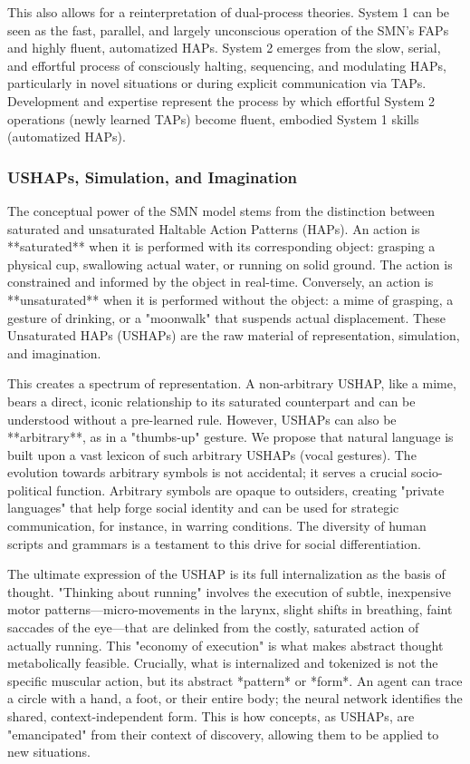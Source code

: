 This also allows for a reinterpretation of dual-process theories. System 1 can be seen as the fast, parallel, and largely unconscious operation of the SMN's FAPs and highly fluent, automatized HAPs. System 2 emerges from the slow, serial, and effortful process of consciously halting, sequencing, and modulating HAPs, particularly in novel situations or during explicit communication via TAPs. Development and expertise represent the process by which effortful System 2 operations (newly learned TAPs) become fluent, embodied System 1 skills (automatized HAPs).

\subsubsection{USHAPs, Simulation, and Imagination}
\label{ssubsec:ushaps}
The conceptual power of the SMN model stems from the distinction between saturated and unsaturated Haltable Action Patterns (HAPs). An action is **saturated** when it is performed with its corresponding object: grasping a physical cup, swallowing actual water, or running on solid ground. The action is constrained and informed by the object in real-time. Conversely, an action is **unsaturated** when it is performed without the object: a mime of grasping, a gesture of drinking, or a "moonwalk" that suspends actual displacement. These Unsaturated HAPs (USHAPs) are the raw material of representation, simulation, and imagination.

This creates a spectrum of representation. A non-arbitrary USHAP, like a mime, bears a direct, iconic relationship to its saturated counterpart and can be understood without a pre-learned rule. However, USHAPs can also be **arbitrary**, as in a "thumbs-up" gesture. We propose that natural language is built upon a vast lexicon of such arbitrary USHAPs (vocal gestures). The evolution towards arbitrary symbols is not accidental; it serves a crucial socio-political function. Arbitrary symbols are opaque to outsiders, creating "private languages" that help forge social identity and can be used for strategic communication, for instance, in warring conditions. The diversity of human scripts and grammars is a testament to this drive for social differentiation.

The ultimate expression of the USHAP is its full internalization as the basis of thought. "Thinking about running" involves the execution of subtle, inexpensive motor patterns—micro-movements in the larynx, slight shifts in breathing, faint saccades of the eye—that are delinked from the costly, saturated action of actually running. This "economy of execution" is what makes abstract thought metabolically feasible. Crucially, what is internalized and tokenized is not the specific muscular action, but its abstract *pattern* or *form*. An agent can trace a circle with a hand, a foot, or their entire body; the neural network identifies the shared, context-independent form. This is how concepts, as USHAPs, are "emancipated" from their context of discovery, allowing them to be applied to new situations.


